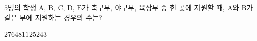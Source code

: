 $5$명의 학생 $\mathrm{A}$, $\mathrm{B}$, $\mathrm{C}$, $\mathrm{D}$, $\mathrm{E}$가 축구부, 야구부, 육상부 중 한 곳에 지원할 때, $\mathrm{A}$와 $\mathrm{B}$가 같은 부에 지원하는 경우의 수는? 
\begin{choices32}{$27$}{$64$}{$81$}{$125$}{$243$}\end{choices32}
